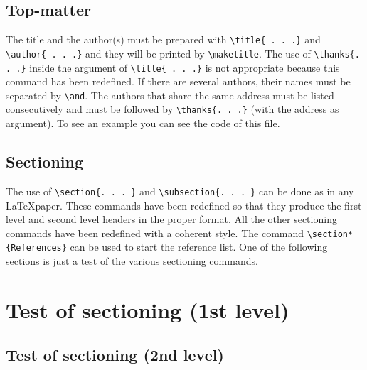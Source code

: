 \documentclass[a4paper,twocolumn,10pt]{article} %
\begin{document}
\subsection{Top-matter}
The title and the author(s) must be prepared with 
\verb+\title{ . . .}+  and \verb+\author{ . . .}+ and they will be 
printed by \verb+\maketitle+.  The use of \verb+\thanks{. . .}+ inside 
the argument of \verb+\title{ . . .}+ is not appropriate because this 
command has been redefined.
If there are several authors, their 
names must be separated by \verb+\and+. The authors that share the 
same address must be listed consecutively and must be followed by 
\verb+\thanks{. . .}+ (with the address as argument). To see an example 
you can see the code of this file. 
\subsection{Sectioning}
The use of \verb+\section{. . . }+  and \verb+\subsection{. . . }+
can be done as in any \LaTeX paper. 
These commands have been redefined so that they 
produce the first level and second level headers in the proper format. 
All the other sectioning commands have been redefined with a coherent 
style. 
The command \verb+\section*{References}+ can be used to start  
the reference list. One of the following sections is just a test of 
the various sectioning commands.
\section{Test of sectioning (1st level)} 
\subsection{Test of sectioning (2nd level)} 
\end{document}
